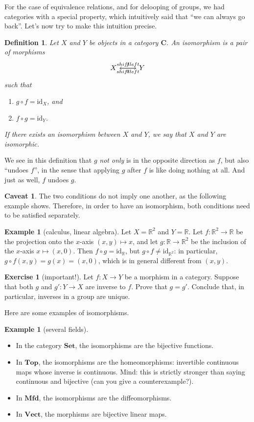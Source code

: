 \documentclass[a4paper,11pt,oneside]{scrbook}
\numberwithin{equation}{section}
\theoremstyle{plain}
\newtheorem{deph}[thm]{Definition}
\theoremstyle{definition}
\newtheorem{eg}[thm]{Example}
\newtheorem*{caveat}{Caveat}
\newtheorem{ex}[thm]{Exercise}
\newcommand{\R}{\mathbb{R}}
\newcommand{\cat}[1]{{\mathbf{#1}}} %
\newcommand{\ar}[2][]{\arrow{#2}{#1}}
\newcommand{\Set}{\cat{Set}}
\newcommand{\Vect}{\cat{Vect}}
\DeclareMathOperator{\1}{\mathbbm{1}}
\DeclareMathOperator{\2}{\mathbbm{2}}
\newcommand{\id}{\mathrm{id}} %
\begin{document}
For the case of equivalence relations, and for delooping of groups, we had categories with a special property, which intuitively said that ``we can always go back''. Let's now try to make this intuition precise.

\begin{deph}\label{defiso}
 Let $X$ and $Y$ be objects in a category $\cat{C}$. An \emph{isomorphism} is a pair of morphisms 
 $$
 \begin{tikzcd}
  X \ar[shift left]{r}{f} & Y \ar[shift left]{l}{g}
 \end{tikzcd}
 $$
 such that 
 \begin{enumerate}
  \item $g\circ f = \id_X$, and
  \item $f\circ g = \id_Y$. 
 \end{enumerate}
 If there exists an isomorphism between $X$ and $Y$, we say that $X$ and $Y$ are \emph{isomorphic}.
\end{deph}

We see in this definition that $g$ \emph{not only} is in the opposite direction as $f$, but also ``undoes $f$'', in the sense that applying $g$ after $f$ is like doing nothing at all. And just as well, $f$ undoes $g$.

\begin{caveat}
 The two conditions do not imply one another, as the following example shows. Therefore, in order to have an isomorphism, both conditions need to be satisfied separately.
\end{caveat}

\begin{eg}[calculus, linear algebra]
 Let $X=\R^2$ and $Y=\R$. Let $f:\R^2\to \R$ be the projection onto the $x$-axis $(x,y)\mapsto x$, and let $g:\R\to \R^2$ be the inclusion of the $x$-axis $x\mapsto (x,0)$. Then $f\circ g = \id_{\R}$, but $g\circ f \ne \id_{\R^2}$: in particular, $g\circ f(x,y) = g(x) = (x,0)$, which is in general different from $(x,y)$. 
\end{eg}

\begin{ex}[important!]
 Let $f:X\to Y$ be a morphism in a category. Suppose that both $g$ and $g':Y\to X$ are inverse to $f$. Prove that $g=g'$. Conclude that, in particular, inverses in a group are unique. 
\end{ex}

Here are some examples of isomorphisms.

\begin{eg}[several fields]
 \begin{itemize}
  \item In the category $\Set$, the isomorphisms are the bijective functions.
  \item In $\cat{Top}$, the isomorphisms are the homeomorphisms: invertible continuous maps whose inverse is continuous. Mind: this is strictly stronger than saying continuous and bijective (can you give a counterexample?).
  \item In $\cat{Mfd}$, the isomorphisms are the diffeomorphisms.
  \item In $\Vect$, the morphisms are bijective linear maps.
 \end{itemize}
\end{eg}
\end{document}
